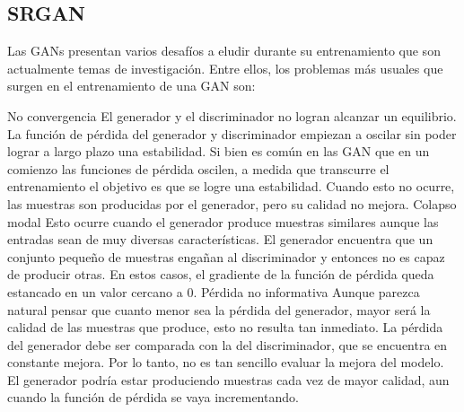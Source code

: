 \subsection{SRGAN}
Las GANs presentan varios desafíos a eludir durante su entrenamiento
que son actualmente temas de investigación. Entre ellos, los problemas más
usuales que surgen en el entrenamiento de una GAN son:

No convergencia
El generador y el discriminador no logran alcanzar un equilibrio. La
función de pérdida del generador y discriminador empiezan a oscilar sin
poder lograr a largo plazo una estabilidad.
Si bien es común en las GAN que en un comienzo las funciones de pérdida
oscilen, a medida que transcurre el entrenamiento el objetivo es que se
logre una estabilidad. Cuando esto no ocurre, las muestras son producidas
por el generador, pero su calidad no mejora.
Colapso modal
Esto ocurre cuando el generador produce muestras similares aunque las
entradas sean de muy diversas características. El generador encuentra que
un conjunto pequeño de muestras engañan al discriminador y entonces
no es capaz de producir otras. En estos casos, el gradiente de la función
de pérdida queda estancado en un valor cercano a 0.
Pérdida no informativa
Aunque parezca natural pensar que cuanto menor sea la pérdida del
generador, mayor será la calidad de las muestras que produce, esto no
resulta tan inmediato. La pérdida del generador debe ser comparada con
la del discriminador, que se encuentra en constante mejora. Por lo tanto,
no es tan sencillo evaluar la mejora del modelo. El generador podría estar
produciendo muestras cada vez de mayor calidad, aun cuando la función
de pérdida se vaya incrementando.


